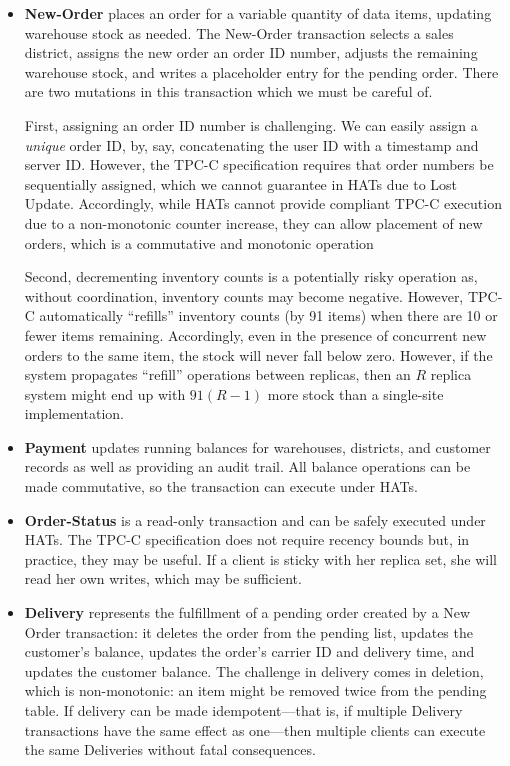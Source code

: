 \begin{itemize}
\item \textbf{New-Order} places an order for a variable quantity of
  data items, updating warehouse stock as needed. The New-Order
  transaction selects a sales district, assigns the new order an order
  ID number, adjusts the remaining warehouse stock, and writes a
  placeholder entry for the pending order. There are two mutations in
  this transaction which we must be careful of.

  First, assigning an order ID number is challenging. We can easily
  assign a \textit{unique} order ID, by, say, concatenating the user
  ID with a timestamp and server ID. However, the TPC-C specification
  requires that order numbers be sequentially assigned, which we
  cannot guarantee in HATs due to Lost Update. Accordingly, while HATs
  cannot provide compliant TPC-C execution due to a non-monotonic
  counter increase, they can allow placement of new orders, which is a
  commutative and monotonic operation

  Second, decrementing inventory counts is a potentially risky
  operation as, without coordination, inventory counts may become
  negative. However, TPC-C automatically ``refills'' inventory counts
  (by 91 items) when there are 10 or fewer items
  remaining. Accordingly, even in the presence of concurrent new
  orders to the same item, the stock will never fall below
  zero. However, if the system propagates ``refill'' operations
  between replicas, then an $R$ replica system might end up with
  $91(R-1)$ more stock than a single-site implementation.

\item \textbf{Payment} updates running balances for warehouses,
  districts, and customer records as well as providing an audit
  trail. All balance operations can be made commutative, so the
  transaction can execute under HATs.

\item \textbf{Order-Status} is a read-only transaction and can be
  safely executed under HATs. The TPC-C specification does not require
  recency bounds but, in practice, they may be useful. If a client is
  sticky with her replica set, she will read her own writes, which may
  be sufficient.

\item \textbf{Delivery} represents the fulfillment of a pending order
  created by a New Order transaction: it deletes the order from the
  pending list, updates the customer's balance, updates the order's
  carrier ID and delivery time, and updates the customer balance. The
  challenge in delivery comes in deletion, which is non-monotonic: an
  item might be removed twice from the pending table. If delivery can
  be made idempotent---that is, if multiple Delivery transactions have
  the same effect as one---then multiple clients can execute the same
  Deliveries without fatal consequences.


\end{itemize}

